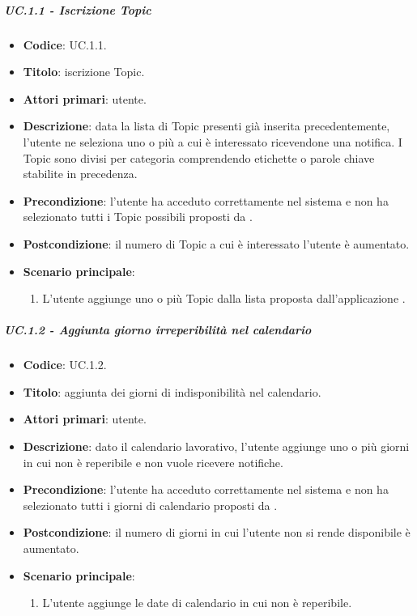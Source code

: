 	\subparagraph{UC\theuccount.1.1 - Iscrizione Topic}
	\begin{itemize}
		\item \textbf{Codice}: UC\theuccount.1.1.
		\item \textbf{Titolo}: iscrizione Topic.
		\item \textbf{Attori primari}: utente.
		\item \textbf{Descrizione}: data la lista di Topic presenti già inserita precedentemente, l'utente ne seleziona uno o più a cui è interessato ricevendone una notifica. I Topic sono divisi per categoria comprendendo etichette o parole chiave stabilite in precedenza.
		\item \textbf{Precondizione}: l'utente ha acceduto correttamente nel sistema e non ha selezionato tutti i Topic possibili proposti da \progetto.
		\item \textbf{Postcondizione}: il numero di Topic a cui è interessato l'utente è aumentato.
		\item \textbf{Scenario principale}:
		\begin{enumerate}
			\item L'utente aggiunge uno o più Topic dalla lista proposta dall'applicazione \progetto.
		\end{enumerate}
	\end{itemize}
		
			
	\subparagraph{UC\theuccount.1.2 - Aggiunta giorno irreperibilità nel calendario} 
	\begin{itemize}
		\item \textbf{Codice}: UC\theuccount.1.2.
		\item \textbf{Titolo}: aggiunta dei giorni di indisponibilità nel calendario.
		\item \textbf{Attori primari}: utente.
		\item \textbf{Descrizione}: dato il calendario lavorativo, l'utente aggiunge uno o più giorni in cui non è reperibile e non vuole ricevere notifiche.
		\item \textbf{Precondizione}: l'utente ha acceduto correttamente nel sistema e non ha selezionato tutti i giorni di calendario proposti da \progetto.
		\item \textbf{Postcondizione}: il numero di giorni in cui l'utente non si rende disponibile è aumentato.
		\item \textbf{Scenario principale}:
		\begin{enumerate}
			\item L'utente aggiunge le date di calendario in cui non è reperibile.
		\end{enumerate}
	\end{itemize}
			
